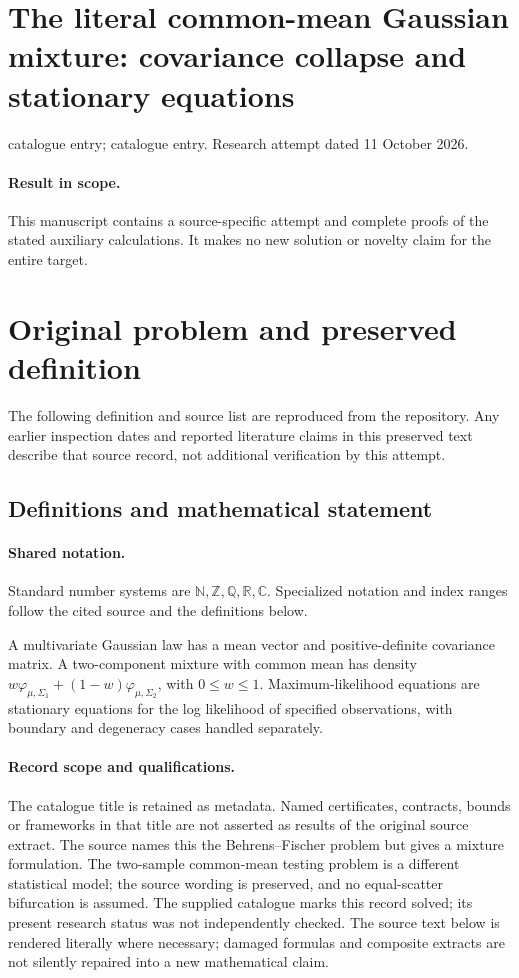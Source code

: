 \documentclass[11pt]{article}
\begin{document}
\section*{The literal common-mean Gaussian mixture: covariance collapse and stationary equations}
\noindent catalogue entry; catalogue entry. Research attempt dated 11 October 2026.
\paragraph{Result in scope.}This manuscript contains a source-specific attempt and complete proofs of the stated auxiliary calculations. It makes no new solution or novelty claim for the entire target.
\section{Original problem and preserved definition}
The following definition and source list are reproduced from the repository. Any earlier inspection dates and reported literature claims in this preserved text describe that source record, not additional verification by this attempt.
\subsection{Definitions and mathematical statement}

\paragraph{Shared notation.}Standard number systems are $\mathbb N,\mathbb Z,\mathbb Q,\mathbb R,\mathbb C$. Specialized notation and index ranges follow the cited source and the definitions below.


A multivariate Gaussian law has a mean vector and positive-definite covariance matrix. A two-component mixture with common mean has density $w\varphi_{\mu,\Sigma_1}+(1-w)\varphi_{\mu,\Sigma_2}$, with $0\leq w\leq1$. Maximum-likelihood equations are stationary equations for the log likelihood of specified observations, with boundary and degeneracy cases handled separately.
\paragraph{Record scope and qualifications.}
The catalogue title is retained as metadata. Named certificates, contracts, bounds or frameworks in that title are not asserted as results of the original source extract.
The source names this the Behrens--Fischer problem but gives a mixture formulation. The two-sample common-mean testing problem is a different statistical model; the source wording is preserved, and no equal-scatter bifurcation is assumed. The supplied catalogue marks this record solved; its present research status was not independently checked.
The source text below is rendered literally where necessary; damaged formulas and composite extracts are not silently repaired into a new mathematical claim.
\end{document}
